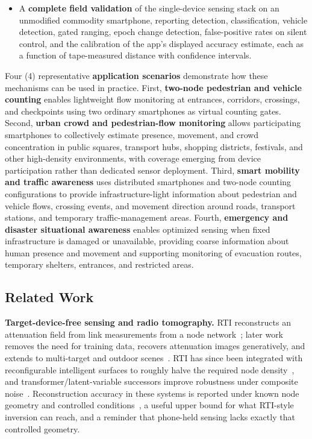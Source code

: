 \documentclass[journal,10pt]{IEEEtran}
\begin{document}
\begin{itemize}
\item A \textbf{complete field validation} of the single-device sensing
stack on an unmodified commodity smartphone, reporting detection, classification,
vehicle detection, gated ranging, epoch change detection, false-positive
rates on silent control, and the calibration of the app's displayed
accuracy estimate, each as a function of tape-measured distance with
confidence intervals.
\end{itemize}

Four (4) representative \textbf{application scenarios} demonstrate how these
mechanisms can be used in practice. First, \textbf{two-node pedestrian and
vehicle counting} enables lightweight flow monitoring at entrances,
corridors, crossings, and checkpoints using two ordinary smartphones as
virtual counting gates. Second, \textbf{urban crowd and pedestrian-flow
monitoring} allows participating smartphones to collectively estimate
presence, movement, and crowd concentration in public squares, transport
hubs, shopping districts, festivals, and other high-density environments,
with coverage emerging from device participation rather than dedicated
sensor deployment. Third, \textbf{smart mobility and traffic awareness}
uses distributed smartphones and two-node counting configurations to provide
infrastructure-light information about pedestrian and vehicle flows,
crossing events, and movement direction around roads, transport stations,
and temporary traffic-management areas. Fourth, \textbf{emergency and
disaster situational awareness} enables optimized sensing when fixed
infrastructure is damaged or unavailable, providing coarse information
about human presence and movement and supporting monitoring of evacuation
routes, temporary shelters, entrances, and restricted areas.

\subsection{Related Work}
\textbf{Target-device-free sensing and radio tomography.} RTI reconstructs an
attenuation field from link measurements from a node
network~\cite{wilson2010}; later work removes the need for training data,
recovers attenuation images generatively, and extends to multi-target and
outdoor scenes~\cite{alippi2016,wu2024}. RTI has since been integrated with
reconfigurable intelligent surfaces to roughly halve the required node
density~\cite{li2024}, and transformer/latent-variable successors improve
robustness under composite noise~\cite{wu2024}. Reconstruction accuracy in these
systems is reported under known node geometry and controlled
conditions~\cite{li2024,wilson2011}, a useful upper bound for what RTI-style
inversion can reach, and a reminder that phone-held sensing lacks exactly that
controlled geometry.
\end{document}

